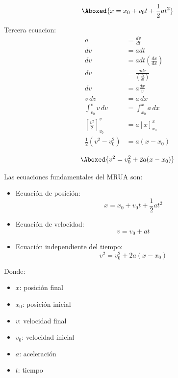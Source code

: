 \vspace{-20pt}

\begin{align*}
    \Aboxed{x = x_0 + v_0 t + \frac{1}{2}at^2}
\end{align*}

Tercera ecuacion:
\begin{align*}
a &= \frac{dv}{dt}\\
dv &= a dt\\
dv &= a dt(\frac{dx}{dx})\\
dv &= \frac{a dx}{(\frac{dx}{dt})}\\
dv &= a\frac{dx}{v}\\
v\,dv &= a\,dx\\
\int_{v_0}^{v} v\,dv &= \int_{x_0}^{x} a\,dx\\
\left[\frac{v^2}{2}\right]_{v_0}^{v} &= a\left[x\right]_{x_0}^{x}\\
\frac{1}{2}(v^2 - v_0^2) &= a(x - x_0)
\end{align*}

\vspace{-30pt}

\begin{align*}
    \Aboxed{v^2 = v_0^2 + 2a(x - x_0)}
\end{align*}

Las ecuaciones fundamentales del MRUA son:

\begin{itemize}
    \item Ecuación de posición:
    \[
    x = x_0 + v_0 t + \frac{1}{2}at^2
    \]

    \item Ecuación de velocidad:
    \[
    v = v_0 + at
    \]

    \item Ecuación independiente del tiempo:
    \[
    v^2 = v_0^2 + 2a(x - x_0)
    \]
\end{itemize}

Donde:
\begin{itemize}
    \setlength{\itemsep}{0pt}
    \item $x$: posición final
    \item $x_0$: posición inicial
    \item $v$: velocidad final
    \item $v_0$: velocidad inicial
    \item $a$: aceleración
    \item $t$: tiempo
\end{itemize}

